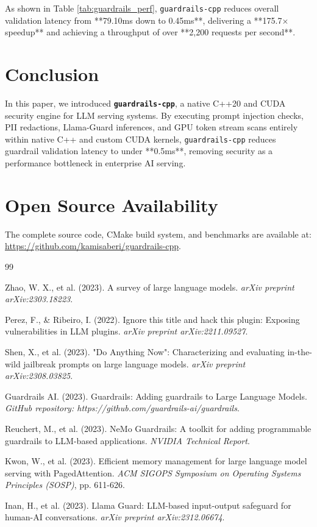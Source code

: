 \documentclass[11pt,onecolumn,a4paper]{article}
\begin{document}
As shown in Table \ref{tab:guardrails_perf}, \texttt{guardrails-cpp} reduces overall validation latency from **79.10ms down to 0.45ms**, delivering a **175.7$\times$ speedup** and achieving a throughput of over **2,200 requests per second**.

\section{Conclusion}
In this paper, we introduced \textbf{\texttt{guardrails-cpp}}, a native C++20 and CUDA security engine for LLM serving systems. By executing prompt injection checks, PII redactions, Llama-Guard inferences, and GPU token stream scans entirely within native C++ and custom CUDA kernels, \texttt{guardrails-cpp} reduces guardrail validation latency to under **0.5ms**, removing security as a performance bottleneck in enterprise AI serving.

\section*{Open Source Availability}
The complete source code, CMake build system, and benchmarks are available at: \url{https://github.com/kamisaberi/guardrails-cpp}.

\begin{thebibliography}{99}

Zhao, W. X., et al. (2023). A survey of large language models. \textit{arXiv preprint arXiv:2303.18223}.

Perez, F., \& Ribeiro, I. (2022). Ignore this title and hack this plugin: Exposing vulnerabilities in LLM plugins. \textit{arXiv preprint arXiv:2211.09527}.

Shen, X., et al. (2023). "Do Anything Now": Characterizing and evaluating in-the-wild jailbreak prompts on large language models. \textit{arXiv preprint arXiv:2308.03825}.

Guardrails AI. (2023). Guardrails: Adding guardrails to Large Language Models. \textit{GitHub repository: https://github.com/guardrails-ai/guardrails}.

Reuchert, M., et al. (2023). NeMo Guardrails: A toolkit for adding programmable guardrails to LLM-based applications. \textit{NVIDIA Technical Report}.

Kwon, W., et al. (2023). Efficient memory management for large language model serving with PagedAttention. \textit{ACM SIGOPS Symposium on Operating Systems Principles (SOSP)}, pp. 611-626.

Inan, H., et al. (2023). Llama Guard: LLM-based input-output safeguard for human-AI conversations. \textit{arXiv preprint arXiv:2312.06674}.

\end{thebibliography}
\end{document}
